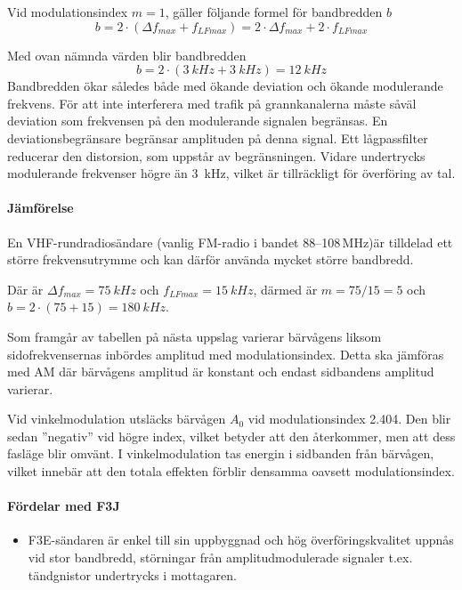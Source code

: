Vid modulationsindex \(m = 1\), gäller följande formel för bandbredden \(b\)
\[
	b = 2 \cdot ( \Delta f_{max} + f_{LFmax}) = 
	2 \cdot \Delta f_{max} + 2 \cdot f_{LFmax}
\]

Med ovan nämnda värden blir bandbredden 
\[
	b = 2 \cdot (\SI{3}{kHz} + \SI{3}{kHz}) = \SI{12}{kHz}
\]
Bandbredden ökar således både med ökande deviation och ökande modulerande
frekvens.
För att inte interferera med trafik på grannkanalerna måste såväl deviation som
frekvensen på den modulerande signalen begränsas.
En deviationsbegränsare begränsar amplituden på denna signal.
Ett lågpassfilter reducerar den distorsion, som uppstår av begränsningen.
Vidare undertrycks modulerande frekvenser högre än 3~kHz, vilket är
tillräckligt för överföring av tal.

\paragraph{Jämförelse}

En VHF-rundradiosändare (vanlig FM-radio i bandet 88--108\,MHz)är tilldelad ett större frekvensutrymme och kan därför
använda mycket större bandbredd.

Där är \(\Delta f_{max} = \SI{75}{kHz}\) och \(f_{LFmax} = \SI{15}{kHz}\), därmed är
\(m = 75/15 = 5\) och \(b = 2 \cdot (75 + 15) = \SI{180}{kHz}\).

Som framgår av tabellen på nästa uppslag varierar bärvågens liksom
sidofrekvensernas inbördes amplitud med modulationsindex.
Detta ska jämföras med AM där bärvågens amplitud är konstant och endast
sidbandens amplitud varierar.

Vid vinkelmodulation utsläcks bärvågen \(A_0\) vid modulationsindex 2.404.
Den blir sedan ''negativ'' vid högre index, vilket betyder att den återkommer,
men att dess fasläge blir omvänt.
I vinkelmodulation tas energin i sidbanden från bärvågen, vilket innebär att
den totala effekten förblir densamma oavsett modulationsindex.


\paragraph{Fördelar med F3J}
\begin{itemize}
\item F3E-sändaren är enkel till sin uppbyggnad och hög överföringskvalitet
	uppnås vid stor bandbredd, störningar från amplitudmodulerade signaler t.ex.
	tändgnistor undertrycks i mottagaren.
\end{itemize}

